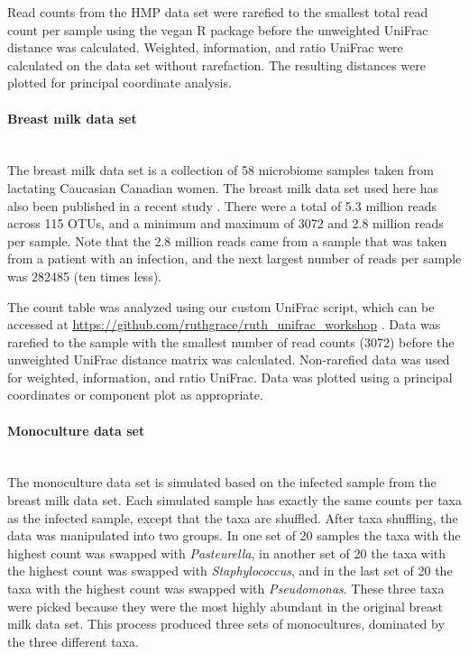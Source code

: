 \documentclass[10pt,letterpaper]{article}
\begin{document}
Read counts from the HMP data set were rarefied to the smallest total read count per sample using the vegan R package \cite{oksanen2007vegan} before the unweighted UniFrac distance was calculated. Weighted, information, and ratio UniFrac were calculated on the data set without rarefaction. The resulting distances were plotted for principal coordinate analysis.

\paragraph{Breast milk data set}\mbox{}\\
The breast milk data set is a collection of 58 microbiome samples taken from lactating Caucasian Canadian women. The breast milk data set used here has also been published in a recent study \cite{urbaniak2016human}. There were a total of 5.3 million reads across 115 OTUs, and a minimum and maximum of 3072 and 2.8 million reads per sample. Note that the 2.8 million reads came from a sample that was taken from a patient with an infection, and the next largest number of reads per sample was 282485 (ten times less).

The count table was analyzed using our custom UniFrac script, which can be accessed at \url{https://github.com/ruthgrace/ruth_unifrac_workshop} \cite{ruth_unifrac_workshop}. Data was rarefied to the sample with the smallest number of read counts (3072) before the unweighted UniFrac distance matrix was calculated. Non-rarefied data was used for weighted, information, and ratio UniFrac. Data was plotted using a principal coordinates or component plot as appropriate.

\paragraph{Monoculture data set}\mbox{}\\
The monoculture data set is simulated based on the infected sample from the breast milk data set. Each simulated sample has exactly the same counts per taxa as the infected sample, except that the taxa are shuffled. After taxa shuffling, the data was manipulated into two groups. In one set of 20 samples the taxa with the highest count was swapped with \textit{Pasteurella}, in another set of 20 the taxa with the highest count was swapped with \textit{Staphylococcus}, and in the last set of 20 the taxa with the highest count was swapped with \textit{Pseudomonas}. These three taxa were picked because they were the most highly abundant in the original breast milk data set. This process produced three sets of monocultures, dominated by the three different taxa.
\end{document}
